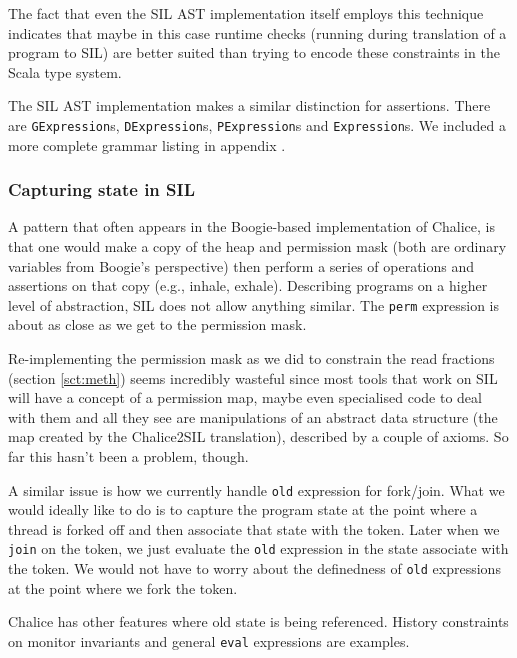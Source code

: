 The fact that even the SIL AST implementation itself employs this technique indicates that maybe in this case runtime checks (running during translation of a program to SIL) are better suited than trying to encode these constraints in the Scala type system.

The SIL AST implementation makes a similar distinction for assertions. 
There are \texttt{GExpression}s, \lstinline!DExpression!s, \lstinline!PExpression!s and \lstinline!Expression!s. 
We included a more complete grammar listing in appendix  \label{apdx:grammar}.

\subsubsection{Capturing state in SIL}
A pattern that often appears in the Boogie-based implementation of Chalice, is that one would make a copy of the heap and permission mask (both are ordinary variables from Boogie's perspective) then perform a series of operations and assertions on that copy (e.g., inhale, exhale).
Describing programs on a higher level of abstraction, SIL does not allow anything similar.
The \lstinline[language=Chalice]!perm! expression is about as close as we get to the permission mask.

Re-implementing the permission mask as we did to constrain the read fractions (section \ref{sct:meth}) seems incredibly wasteful since most tools that  work on SIL will have a concept of a permission map, maybe even specialised code to deal with them and all they see are manipulations of an abstract data structure (the map created by the Chalice2SIL translation), described by a couple of axioms.
So far this hasn't been a problem, though.

A similar issue is how we currently handle \lstinline[language=Chalice]!old! expression for fork/join.
What we would ideally like to do is to capture the program state at the point where a thread is forked off and then associate that state with the token.
Later when we \lstinline[language=Chalice]!join! on the token, we just evaluate the \lstinline[language=Chalice]!old! expression in the state associate with the token. 
We would not have to worry about the definedness of \lstinline[language=Chalice]!old! expressions at the point where we fork the token.

Chalice has other features where old state is being referenced. 
History constraints on monitor invariants and general \lstinline[language=Chalice]!eval! expressions are examples.

